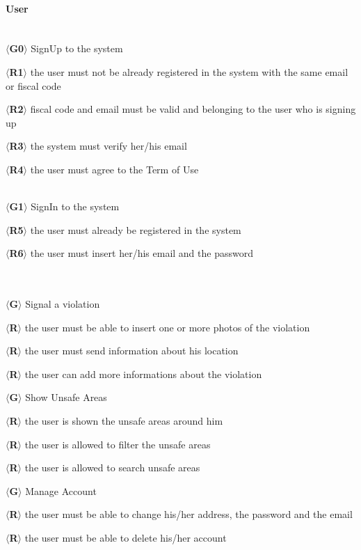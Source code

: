 \documentclass{article}
\begin{document}
\paragraph{User}\mbox{}\\
$\langle$\textbf{G0}$\rangle$ SignUp to the system
\begin{description}
    \item $\langle$\textbf{R1}$\rangle$ the user must not be already registered
    in the system with the same email or fiscal code
    \item $\langle$\textbf{R2}$\rangle$ fiscal code and email must be valid and
    belonging to the user who is signing up
    \item $\langle$\textbf{R3}$\rangle$ the system must verify her/his email
    \item $\langle$\textbf{R4}$\rangle$ the user must agree to the Term of Use
\end{description}\mbox{}\\
$\langle$\textbf{G1}$\rangle$ SignIn to the system
\begin{description}
    \item $\langle$\textbf{R5}$\rangle$ the user must already be registered in
    the system
    \item $\langle$\textbf{R6}$\rangle$ the user must insert her/his email and
    the password \end{description}\mbox{}\\\\
$\langle$\textbf{G}$\rangle$ Signal a violation
\begin{description}
    \item $\langle$\textbf{R}$\rangle$ the user must be able to insert one or
    more photos of the violation
    \item $\langle$\textbf{R}$\rangle$ the user must send information about his
    location
    \item $\langle$\textbf{R}$\rangle$ the user can add more informations about
    the violation
\end{description}
$\langle$\textbf{G}$\rangle$ Show Unsafe Areas
\begin{description}
    \item $\langle$\textbf{R}$\rangle$ the user is shown the unsafe areas around
    him
    \item $\langle$\textbf{R}$\rangle$ the user is allowed to filter the unsafe
    areas
    \item $\langle$\textbf{R}$\rangle$ the user is allowed to search unsafe
    areas 
\end{description}    
$\langle$\textbf{G}$\rangle$ Manage Account
\begin{description}
    \item $\langle$\textbf{R}$\rangle$ the user must be able to change his/her
    address, the password and the email
    \item $\langle$\textbf{R}$\rangle$ the user must be able to delete his/her
    account
\end{description}
\end{document}

